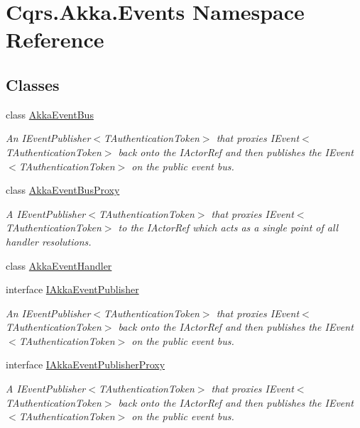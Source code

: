 \hypertarget{namespaceCqrs_1_1Akka_1_1Events}{}\section{Cqrs.\+Akka.\+Events Namespace Reference}
\label{namespaceCqrs_1_1Akka_1_1Events}
\subsection*{Classes}
\begin{DoxyCompactItemize}
\item 
class \hyperlink{classCqrs_1_1Akka_1_1Events_1_1AkkaEventBus}{Akka\+Event\+Bus}
\begin{DoxyCompactList}\small\item\em An I\+Event\+Publisher$<$\+T\+Authentication\+Token$>$ that proxies I\+Event$<$\+T\+Authentication\+Token$>$ back onto the I\+Actor\+Ref and then publishes the I\+Event$<$\+T\+Authentication\+Token$>$ on the public event bus. \end{DoxyCompactList}\item 
class \hyperlink{classCqrs_1_1Akka_1_1Events_1_1AkkaEventBusProxy}{Akka\+Event\+Bus\+Proxy}
\begin{DoxyCompactList}\small\item\em A I\+Event\+Publisher$<$\+T\+Authentication\+Token$>$ that proxies I\+Event$<$\+T\+Authentication\+Token$>$ to the I\+Actor\+Ref which acts as a single point of all handler resolutions. \end{DoxyCompactList}\item 
class \hyperlink{classCqrs_1_1Akka_1_1Events_1_1AkkaEventHandler}{Akka\+Event\+Handler}
\item 
interface \hyperlink{interfaceCqrs_1_1Akka_1_1Events_1_1IAkkaEventPublisher}{I\+Akka\+Event\+Publisher}
\begin{DoxyCompactList}\small\item\em An I\+Event\+Publisher$<$\+T\+Authentication\+Token$>$ that proxies I\+Event$<$\+T\+Authentication\+Token$>$ back onto the I\+Actor\+Ref and then publishes the I\+Event$<$\+T\+Authentication\+Token$>$ on the public event bus. \end{DoxyCompactList}\item 
interface \hyperlink{interfaceCqrs_1_1Akka_1_1Events_1_1IAkkaEventPublisherProxy}{I\+Akka\+Event\+Publisher\+Proxy}
\begin{DoxyCompactList}\small\item\em A I\+Event\+Publisher$<$\+T\+Authentication\+Token$>$ that proxies I\+Event$<$\+T\+Authentication\+Token$>$ back onto the I\+Actor\+Ref and then publishes the I\+Event$<$\+T\+Authentication\+Token$>$ on the public event bus. \end{DoxyCompactList}\end{DoxyCompactItemize}
